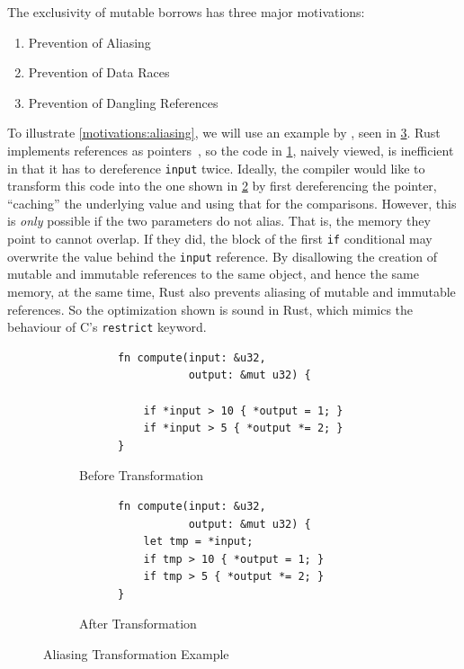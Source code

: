 \documentclass[sigplan,11pt,screen,nonacm]{acmart}
\begin{document}
The exclusivity of mutable borrows has three major motivations:
\begin{enumerate}
  \item Prevention of Aliasing \label{motivations:aliasing}
  \item Prevention of Data Races \label{motivations:data-races}
  \item Prevention of Dangling References \label{motivations:dangling}
\end{enumerate}

To illustrate \cref{motivations:aliasing}, we will use an example by \citet{rust:nomicon}, seen in \cref{lst:aliasing}. Rust implements references as pointers~\cite{rust:core-ref}, so the code in \cref{lst:aliasing:before-transformation}, naively viewed, is inefficient in that it has to dereference \texttt{input} twice. Ideally, the compiler would like to transform this code into the one shown in \cref{lst:aliasing:after-transformation} by first dereferencing the pointer, \enquote{caching} the underlying value and using that for the comparisons. However, this is \emph{only} possible if the two parameters do not alias. That is, the memory they point to cannot overlap. If they did, the block of the first \texttt{if} conditional may overwrite the value behind the \texttt{input} reference. By disallowing the creation of mutable and immutable references to the same object, and hence the same memory, at the same time, Rust also prevents aliasing of mutable and immutable references. So the optimization shown is sound in Rust, which mimics the behaviour of C's \texttt{restrict} keyword.

\begin{figure}
  \centering
  \begin{subfigure}{0.42\textwidth}
    \centering
    \begin{verbatim}
      fn compute(input: &u32,
                 output: &mut u32) {

          if *input > 10 { *output = 1; }
          if *input > 5 { *output *= 2; }
      }
    \end{verbatim}
    \caption{Before Transformation} \label{lst:aliasing:before-transformation}
  \end{subfigure}
  \begin{subfigure}{0.42\textwidth}
    \centering
    \begin{verbatim}
      fn compute(input: &u32,
                 output: &mut u32) {
          let tmp = *input;
          if tmp > 10 { *output = 1; }
          if tmp > 5 { *output *= 2; }
      }
    \end{verbatim}
    \caption{After Transformation} \label{lst:aliasing:after-transformation}
  \end{subfigure}
  \caption{Aliasing Transformation Example} \label{lst:aliasing}
\end{figure}
\end{document}
